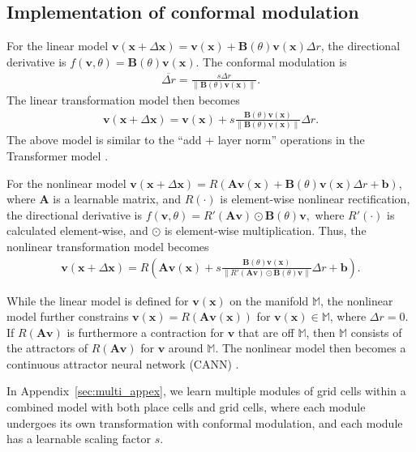 \documentclass{article}
\def\vb{{\bm{b}}}
\def\vv{{\bm{v}}}
\def\vx{{\bm{x}}}
\def\mA{{\bm{A}}}
\def\mB{{\bm{B}}}
\begin{document}
\subsection{Implementation of conformal modulation}

For the linear model  $\vv(\vx+\Delta \vx) =  \vv(\vx) + \mB(\theta) \vv(\vx) \Delta r$,
 the directional derivative is $f(\vv, \theta) = \mB(\theta) \vv(\vx)$. The conformal modulation is 
 \begin{eqnarray}
   \overline{\Delta r} = \frac{s \Delta r}{\|\mB(\theta) \vv(\vx)\|}.
 \end{eqnarray}
The linear transformation model then becomes 
\begin{eqnarray}
  \vv(\vx+\Delta \vx) =  \vv(\vx) + s\frac{ \mB(\theta) \vv(\vx) }{\|\mB(\theta)\vv(\vx)\|}\Delta r. \label{eq:linear}
\end{eqnarray}
The above model is similar to the ``add + layer norm'' operations in the Transformer model \citep{vaswani2017attention}. 


For the nonlinear model $\vv(\vx+\Delta \vx) = R(\mA \vv(\vx) + \mB(\theta) \vv(\vx) \Delta r + \vb)$, where $\mA$ is a learnable matrix, and $R(\cdot)$ is element-wise nonlinear rectification, the directional derivative is 
\(
    f(\vv, \theta) = R'(\mA \vv) \odot \mB(\theta) \vv, 
\)
where $R'(\cdot)$ is calculated element-wise, and $\odot$ is element-wise multiplication. Thus, the nonlinear transformation model becomes
\begin{eqnarray}
  \vv(\vx+\Delta \vx) =  R(\mA \vv(\vx) + s \frac{\mB(\theta) \vv(\vx)}{\|R'(\mA \vv) \odot \mB(\theta) \vv\|} \Delta r + \vb). \label{eq:nonlinear}
\end{eqnarray}

While the linear model is defined for $\vv(\vx)$ on the manifold $\mathbb{M}$, the nonlinear model further constrains 
\(
   \vv(\vx) = R(\mA \vv(\vx))
\) for $\vv(\vx) \in \mathbb{M}$, where $\Delta r = 0$. If $R(\mA \vv)$ is furthermore a contraction for $\vv$ that are off $\mathbb{M}$, then $\mathbb{M}$ consists of the attractors of $R(\mA \vv)$ for $\vv$ around $\mathbb{M}$. The nonlinear model then becomes a continuous attractor neural network (CANN) \citep{amit1992modeling,burak2009accurate,Couey2013,Pastoll2013,Agmon2020}. 

In Appendix~\ref{sec:multi_appex}, we learn multiple modules of grid cells within a combined model with both place cells and grid cells, where each module undergoes its own transformation with conformal modulation, and each module has a learnable scaling factor $s$.  
\end{document}
